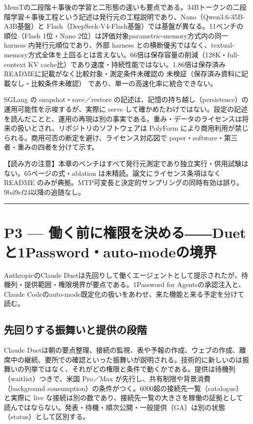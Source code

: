 \documentclass[lualatex,a4paper,10pt]{jlreq}
\begin{document}
MemTの二段階＋事後の学習と二形態の違いも要点である。34Bトークンの二段階学習＋事後工程という記述は発行元の工程説明であり、Nano（Qwen3.6-35B-A3B基盤）と Flash（DeepSeek-V4-Flash基盤）では基盤が異なる。11ベンチの順位（Flash 1位・Nano 2位）は評価対象parametric-memory方式内の同一 harness 内発行元順位であり、外部 harness との横断優劣ではなく、textual-memory方式全体を上回るとは言えない。66倍は保存容量の削減（128K・full-context KV cache比）であり速度・持続性能ではない。1.86倍は保存済みREADMEに記載がなく比較対象・測定条件未確認の 未検証（保存済み資料に記載なし・比較条件未確認） であり、単一の高速化率に統合できない。


SGLang の snapshot・save／restore の記述は、記憶の持ち越し（persistence）の運用可能性を示唆するが、実際に serve して確かめたわけではない。設定の記述を読んだことと、運用の再現は別の事実である。重み・データのライセンスは将来の扱いとされ、リポジトリのソフトウェアは PolyForm により商用利用が禁じられる。商用可否の断定を避け、ライセンス対応図で paper・software・第三者・重みの四者を分けて示す。


\begin{tcolorbox}[colback=SurveySoft,colframe=SurveyRule,arc=1mm,boxrule=0.4pt,left=2mm,right=2mm]
【読み方の注意】本章のベンチはすべて発行元測定であり独立実行・供用試験はない。65ページの式・ablation は未精読。論文にライセンス条項はなく README のみが典拠。MTP可変長と決定的サンプリングの同時有効は誤り。9bd9cf24以降の追随なし。

\end{tcolorbox}


\bigskip\hrule\bigskip


\section{P3 --- 働く前に権限を決める――Duetと1Password・auto-modeの境界}
\label{sec:P3}


AnthropicのClaude Duetは先回りして働くエージェントとして提示されたが、待機列・提供範囲・権限境界が要点である。1Password for Agentsの承認注入と、Claude Codeのauto-mode既定化の扱いをあわせ、来た機能と来る予定を分けて読む。


\subsection*{先回りする振舞いと提供の段階}


Claude Duetは朝の要点整理、接続の監視、表や予報の作成、ウェブの作成、離席中の継続、要所での確認といった振舞いが説明される。技術的に新しいのは振舞いの列挙ではなく、それがどの権限と条件で動くかである。提供は待機列（waitlist）つきで、米国 Pro／Max が先行し、共有制限や背景消費（background consumption）の条件がつく。6000超の接続先一覧（catalogue）と実際に live な接続は別の数であり、接続先一覧の大きさを稼働の証拠として読んではならない。発表・待機・順次公開・一般提供（GA）は別の状態（status）として区別する。
\end{document}
